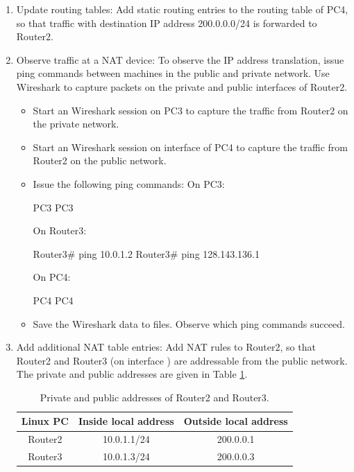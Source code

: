 \begin{enumerate}
	\item Update routing tables: Add static routing entries to the routing table of PC4, so that traffic with destination IP address 200.0.0.0/24 is forwarded to Router2.
	\item Observe traffic at a NAT device: To observe the IP address translation, issue ping commands between machines in the public and private network. Use Wireshark to capture packets on the private and public interfaces of Router2.
		\begin{itemize}	
			\item Start an Wireshark session on PC3 to capture the traffic from Router2 on the private network.
			\item Start an Wireshark session on interface  of PC4 to capture the traffic from Router2 on the public network.
			\item Issue the following ping commands: 
				On PC3:
				\begin{cmdblock}
	PC3%
	PC3%
				\end{cmdblock}
				On Router3:
				\begin{cmdblock}
	Router3# ping 10.0.1.2
	Router3# ping 128.143.136.1
				\end{cmdblock}
				On PC4:
				\begin{cmdblock}
	PC4%
	PC4%
				\end{cmdblock}
			\item Save the Wireshark data to files. Observe which ping commands succeed.
		\end{itemize}
	\item Add additional NAT table entries: Add NAT rules to Router2, so that Router2 and Router3 (on interface ) are addressable from the public network. The private and public addresses are given in Table \ref{tab:lab7-nat-router2-router3}.
		\begin{table}[h!t]
			\centering
			\begin{tabular}{| c | c | c |}	
				\hline
				\textbf{Linux PC} & \textbf{Inside local address} & \textbf{Outside local address}  \\ \hline
				Router2 & 10.0.1.1/24 & 200.0.0.1 \\ 
				Router3 & 10.0.1.3/24 & 200.0.0.3 \\ \hline
			\end{tabular}
			\caption{Private and public addresses of Router2 and Router3.}
			\label{tab:lab7-nat-router2-router3}
		\end{table}
\end {enumerate}

